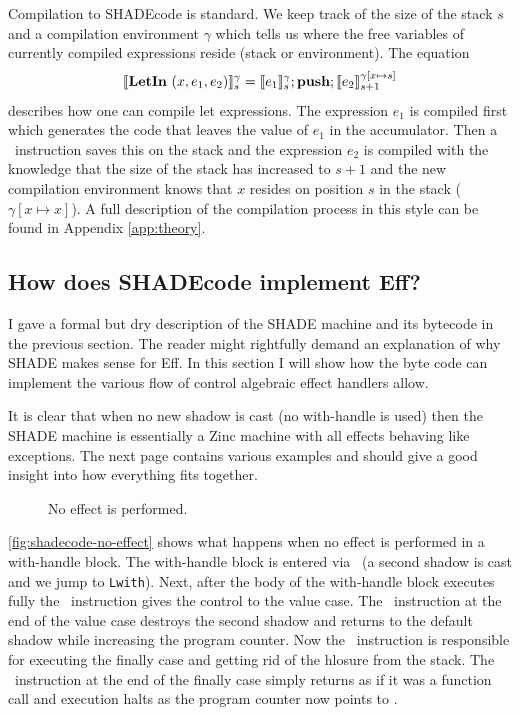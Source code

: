 \documentclass[class=article, crop=false]{standalone}
\begin{document}
Compilation to SHADEcode is standard. We keep track of the size of the stack $s$ and a compilation
environment $\gamma$ which tells us where the free variables of currently compiled expressions
reside (stack or environment). The equation
$$ \llbracket \mathbf{LetIn}\ (x, e_1, e_2) \rrbracket_s^\gamma = \llbracket e_1 \rrbracket_s^\gamma; \textbf{push}; \llbracket e_2 \rrbracket_{s+1}^{\gamma[x \mapsto s]} $$
describes how one can compile let expressions. The expression $e_1$ is compiled first which generates the code
that leaves the value of $e_1$ in the accumulator. Then a \vmPush\ instruction saves this
on the stack and the expression $e_2$ is compiled with the knowledge that the size of the stack
has increased to $s+1$ and the new compilation environment knows that $x$ resides on position
$s$ in the stack ($\gamma[x \mapsto x]$). A full description of the compilation process in this
style can be found in Appendix \autoref{app:theory}.

\subsection{How does SHADEcode implement Eff?}
\label{sec:shade-illustration}

I gave a formal but dry description of the SHADE machine and its bytecode in the previous section.
The reader might rightfully demand an explanation of why SHADE makes sense for Eff. In this section
I will show how the byte code can implement the various flow of control algebraic effect handlers allow.

It is clear that when no new shadow is cast (no with-handle is used) then the SHADE machine is essentially a Zinc machine with
all effects behaving like exceptions. The next page contains various examples and should give a good insight
into how everything fits together.

\begin{figure}
    \centering
    \caption{No effect is performed.}
    \label{fig:shadecode-no-effect}
\end{figure}

\autoref{fig:shadecode-no-effect} shows what happens when no effect is performed in
a with-handle block. The with-handle block is entered via \vmCastShadow\ (a second shadow
is cast and we jump to \lstinline{Lwith}). Next, after the body of the with-handle block
executes fully the \vmKillShadow\ instruction gives the control to the value case.
The \vmRett\ instruction at the end of the value case destroys the second shadow
and returns to the default shadow while increasing the program counter. Now the
\vmFin\ instruction is responsible for executing the finally case and getting rid
of the hlosure from the stack. The \vmRet\ instruction at the end of the finally case
simply returns as if it was a function call and execution halts as the program counter
now points to \vmHalt.
\end{document}
